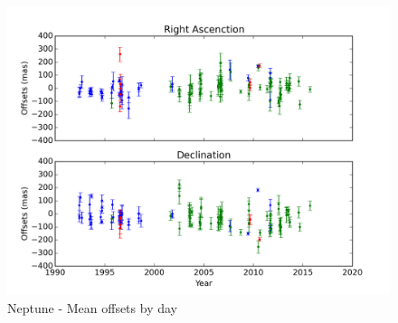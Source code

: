 \documentclass[12pt,a4paper]{report}
\begin{document}


\begin{figure}
\includegraphics[width=15.0cm]{Neptune_offsets.png} 
\caption{Neptune - Mean offsets by day}
\label{Fig:netuno-media}
\end{figure}
\end{document}
